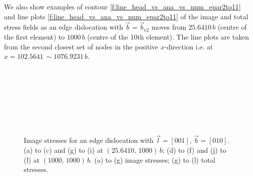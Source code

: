 \documentclass[11pt]{iopart}
\begin{document}
We also show examples of contour \cref{f:line_head_vs_ana_vs_num_epar2to11} and line plots \cref{f:line_head_vs_ana_vs_num_epar2to11} of the image and total stress fields as an edge dislocation with $\vec{b} = \vec{b}_{\textrm{e2}}$ moves from $25.6410\, b$ (centre of the first element) to $1000\, b$ (centre of the 10th element). The line plots are taken from the second closest set of nodes in the positive $x$-direction i.e. at $x = 102.5641\, \sim 1076.9231\, b$.
\begin{figure}
    \centering
    ~
    ~

    ~
    ~

    ~
    ~

    ~
    ~
    \caption{Image stresses for an edge dislocation with $\vec{l} = [0 0 1]$, $\vec{b} = [0 1 0]$. (a) to (c) and (g) to (i) at $(25.6410,\, 1000)\, b$; (d) to (f) and (j) to (l) at $(1000,\, 1000)\, b$. (a) to (g) image stresses; (g) to (l) total stresses.}
    \label{f:head_vs_ana_vs_num_epar2to11}
\end{figure}
\end{document}
